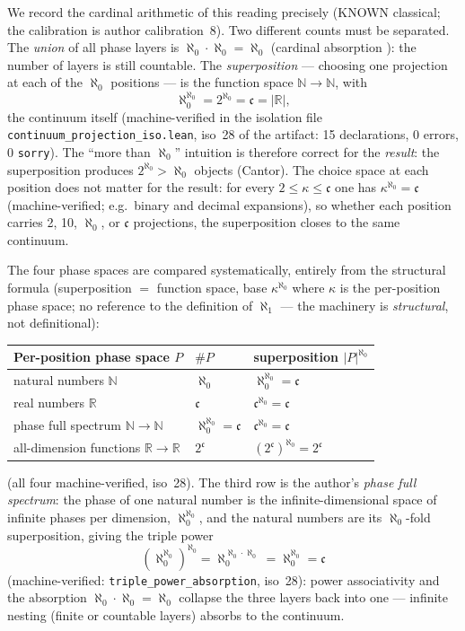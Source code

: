 \documentclass{article}
\begin{document}
We record the cardinal arithmetic of this reading precisely (KNOWN
classical; the calibration is author calibration~8). Two different
counts must be separated. The \emph{union} of all phase layers is
$\aleph_0\cdot\aleph_0=\aleph_0$ (cardinal absorption \cite{halmos}): the number of
layers is still countable. The \emph{superposition} --- choosing one
projection at each of the $\aleph_0$ positions --- is the function space
$\mathbb{N}\to\mathbb{N}$, with
\[
\aleph_0^{\aleph_0}=2^{\aleph_0}=\mathfrak c=|\mathbb{R}|,
\]
the continuum itself (machine-verified in the isolation file
\texttt{continuum\_projection\_iso.lean}, iso~28 of the artifact: 15
declarations, 0 errors, 0 \texttt{sorry}). The ``more than $\aleph_0$''
intuition is therefore correct for the \emph{result}: the superposition
produces $2^{\aleph_0}>\aleph_0$ objects (Cantor). The choice space at
each position does not matter for the result: for every
$2\le\kappa\le\mathfrak c$ one has $\kappa^{\aleph_0}=\mathfrak c$
(machine-verified; e.g.\ binary and decimal expansions), so whether each
position carries 2, 10, $\aleph_0$, or $\mathfrak c$ projections, the
superposition closes to the same continuum.

The four phase spaces are compared systematically, entirely from the
structural formula (superposition $=$ function space, base
$\kappa^{\aleph_0}$ where $\kappa$ is the per-position phase space; no
reference to the definition of $\aleph_1$ --- the machinery is
\emph{structural}, not definitional):

\begin{center}
\small
\begin{tabular}{lll}
\hline
Per-position phase space $P$ & $\#P$ & superposition $|P|^{\aleph_0}$ \\
\hline
natural numbers $\mathbb N$ & $\aleph_0$ & $\aleph_0^{\aleph_0}=\mathfrak c$ \\
real numbers $\mathbb R$ & $\mathfrak c$ & $\mathfrak c^{\aleph_0}=\mathfrak c$ \\
phase full spectrum $\mathbb N\to\mathbb N$ &
$\aleph_0^{\aleph_0}=\mathfrak c$ & $\mathfrak c^{\aleph_0}=\mathfrak c$ \\
all-dimension functions $\mathbb R\to\mathbb R$ & $2^{\mathfrak c}$ &
$(2^{\mathfrak c})^{\aleph_0}=2^{\mathfrak c}$ \\
\hline
\end{tabular}
\end{center}

(all four machine-verified, iso~28). The third row is the author's
\emph{phase full spectrum}: the phase of one natural number is the
infinite-dimensional space of infinite phases per dimension,
$\aleph_0^{\aleph_0}$, and the natural numbers are its
$\aleph_0$-fold superposition, giving the triple power
\[
(\aleph_0^{\aleph_0})^{\aleph_0}
=\aleph_0^{\aleph_0\cdot\aleph_0}
=\aleph_0^{\aleph_0}
=\mathfrak c
\]
(machine-verified: \texttt{triple\_power\_absorption}, iso~28): power
associativity and the absorption $\aleph_0\cdot\aleph_0=\aleph_0$
collapse the three layers back into one --- infinite nesting (finite or
countable layers) absorbs to the continuum.
\end{document}
